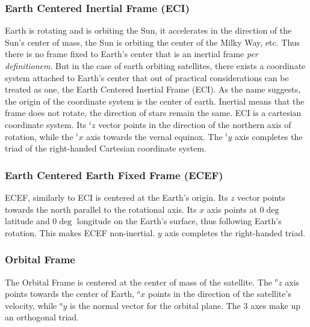 \subsubsection{Earth Centered Inertial Frame (ECI)}
Earth is rotating and is orbiting the Sun, it accelerates in the direction of the Sun's center of mass, the Sun is orbiting the center of the Milky Way, etc. Thus there is no frame fixed to Earth's center that is an inertial frame \textit{per definitionem}. But in the case of earth orbiting satellites, there exists a coordinate system attached to Earth's center that out of practical considerations can be treated as one, the Earth Centered Inertial Frame (ECI).
As the name suggests, the origin of the coordinate system is the center of earth. Inertial means that the frame does not rotate, the direction of stars remain the same. 
ECI is a cartesian coordinate system. Its $^iz$ vector points in the direction of the northern axis of rotation, while the $^ix$ axis towards the vernal equinox. The $^iy$ axis completes the triad of the right-handed Cartesian coordinate system.




\subsubsection{Earth Centered Earth Fixed Frame (ECEF)}

ECEF, similarly to ECI is centered at the Earth's origin. Its $z$ vector points towards the north parallel to the rotational axis. Its $x$ axis points at $0\deg$ latitude and $0\deg$ longitude on the Earth's surface, thus following Earth's rotation. This makes ECEF non-inertial. $y$ axis completes the right-handed triad.

\subsubsection{Orbital Frame}

The Orbital Frame is centered at the center of mass of the satellite. The $^oz$ axis points towards the center of Earth, $^ox$ points in the direction of the satellite's velocity, while $^oy$ is the normal vector for the orbital plane. The 3 axes make up an orthogonal triad.


